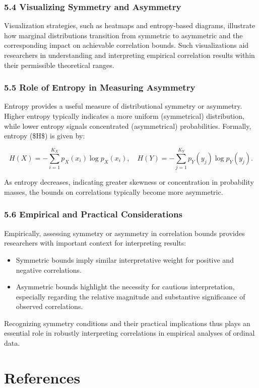 \documentclass[
  12pt,
]{article}
\providecommand{\tightlist}{%
  \setlength{\itemsep}{0pt}\setlength{\parskip}{0pt}}\usepackage{longtable,booktabs,array}
\begin{document}
\subsubsection{5.4 Visualizing Symmetry and
Asymmetry}\label{visualizing-symmetry-and-asymmetry}

Visualization strategies, such as heatmaps and entropy-based diagrams,
illustrate how marginal distributions transition from symmetric to
asymmetric and the corresponding impact on achievable correlation
bounds. Such visualizations aid researchers in understanding and
interpreting empirical correlation results within their permissible
theoretical ranges.

\subsubsection{5.5 Role of Entropy in Measuring
Asymmetry}\label{role-of-entropy-in-measuring-asymmetry}

Entropy provides a useful measure of distributional symmetry or
asymmetry. Higher entropy typically indicates a more uniform
(symmetrical) distribution, while lower entropy signals concentrated
(asymmetrical) probabilities. Formally, entropy (\$H\$) is given by:

\[
H(X) = -\sum_{i=1}^{K_X} p_X(x_i) \log p_X(x_i), \quad H(Y) = -\sum_{j=1}^{K_Y} p_Y(y_j) \log p_Y(y_j).
\]

As entropy decreases, indicating greater skewness or concentration in
probability masses, the bounds on correlations typically become more
asymmetric.

\subsubsection{5.6 Empirical and Practical
Considerations}\label{empirical-and-practical-considerations}

Empirically, assessing symmetry or asymmetry in correlation bounds
provides researchers with important context for interpreting results:

\begin{itemize}
\tightlist
\item
  Symmetric bounds imply similar interpretative weight for positive and
  negative correlations.
\item
  Asymmetric bounds highlight the necessity for cautious interpretation,
  especially regarding the relative magnitude and substantive
  significance of observed correlations.
\end{itemize}

Recognizing symmetry conditions and their practical implications thus
plays an essential role in robustly interpreting correlations in
empirical analyses of ordinal data.

\newpage

\section{References}\label{references}

\printbibliography[heading=none]

\newpage
\end{document}
